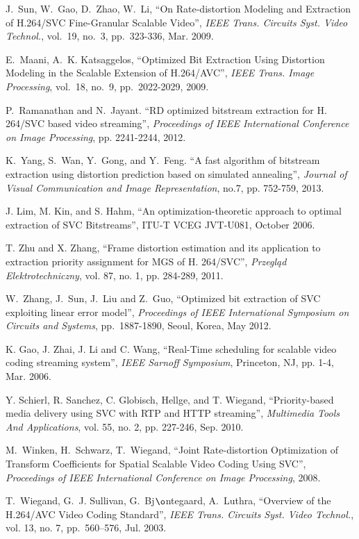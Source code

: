\documentclass[journal]{IEEEtran}
\begin{document}
\begin{thebibliography}{1}
J.~Sun, W.~Gao, D.~Zhao, W.~Li, ``On Rate-distortion Modeling and Extraction of H.264/SVC Fine-Granular Scalable Video'', {\em IEEE Trans. Circuits Syst. Video Technol.}, vol.~19, no.~3, pp.~323-336, Mar. 2009.

E.~Maani, A.~K. Katsaggelos, ``Optimized Bit Extraction Using Distortion Modeling in the Scalable Extension of H.264/AVC'', {\em IEEE Trans. Image Processing}, vol.~18, no.~9, pp.~2022-2029, 2009.

P.~Ramanathan and N.~Jayant. ``RD optimized bitstream extraction for H. 264/SVC based video streaming'', {\em Proceedings of IEEE International Conference on Image Processing}, pp. 2241-2244, 2012.

K.~Yang, S.~Wan, Y.~Gong, and Y.~Feng. ``A fast algorithm of bitstream extraction using distortion prediction based on simulated annealing'', {\em Journal of Visual Communication and Image Representation}, no.7, pp. 752-759, 2013.

J. Lim, M. Kin, and S. Hahm, ``An optimization-theoretic approach to optimal extraction of SVC Bitstreams'', ITU-T VCEG
JVT-U081, October 2006.

T. Zhu and X. Zhang, ``Frame distortion estimation and its application to extraction priority assignment for MGS of H. 264/SVC'', {\em Przegląd Elektrotechniczny}, vol. 87, no. 1, pp. 284-289, 2011.

W.~Zhang, J.~Sun, J.~Liu and Z.~Guo, ``Optimized bit extraction of SVC exploiting linear error model'', {\em Proceedings of IEEE International Symposium on Circuits and Systems}, pp.~1887-1890, Seoul, Korea, May 2012.

K. Gao, J. Zhai, J. Li and C. Wang, ``Real-Time scheduling for scalable video coding streaming system'', {\em IEEE Sarnoff Symposium}, Princeton, NJ, pp. 1-4, Mar. 2006.

Y. Schierl, R. Sanchez, C. Globisch, Hellge, and T. Wiegand, ``Priority-based media delivery using SVC with RTP and HTTP streaming'', {\em Multimedia Tools And Applications}, vol. 55, no. 2, pp. 227-246, Sep. 2010.

M.~Winken, H.~Schwarz, T.~Wiegand, ``Joint Rate-distortion Optimization of Transform Coefficients for Spatial Scalable Video Coding Using SVC'', {\em Proceedings of IEEE International Conference on Image Processing}, 2008.

T.~Wiegand, G.~J. Sullivan, G.~Bj$\o$ntegaard, A.~Luthra, ``Overview of the H.264/AVC Video Coding Standard'', {\em IEEE Trans. Circuits Syst. Video Technol.}, vol. 13, no. 7, pp.~560--576, Jul. 2003.


\end{thebibliography}
\end{document}
